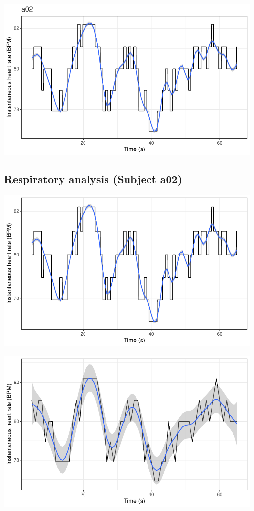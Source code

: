 \documentclass[
]{article}
\begin{document}
\begin{center}\includegraphics{report_files/figure-latex/rr-interval-8} \end{center}

\newpage

\hypertarget{respiratory-analysis-subject-a02}{%
\subsection{Respiratory analysis (Subject
a02)}\label{respiratory-analysis-subject-a02}}

\begin{center}\includegraphics{report_files/figure-latex/resp-1} \end{center}

\begin{center}\includegraphics{report_files/figure-latex/resp-2} \end{center}
\end{document}
